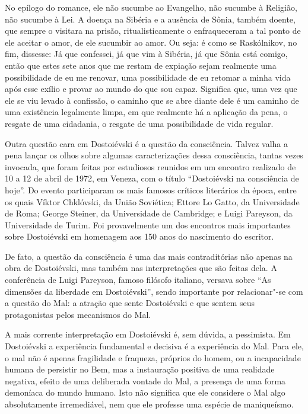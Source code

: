 No epílogo do romance, ele não sucumbe ao Evangelho, não sucumbe à
Religião, não sucumbe à Lei. A doença na Sibéria e a ausência de Sônia,
também doente, que sempre o visitara na prisão, ritualisticamente o
enfraqueceram a tal ponto de ele aceitar o amor, de ele sucumbir ao
amor. Ou seja: é como se Raskólnikov, no fim, dissesse: Já que
confessei, já que vim à Sibéria, já que Sônia está comigo, então que
estes sete anos que me restam de expiação sejam realmente uma
possibilidade de eu me renovar, uma possibilidade de eu retomar a minha
vida após esse exílio e provar ao mundo do que sou capaz. Significa que,
uma vez que ele se viu levado à confissão, o caminho que se abre diante
dele é um caminho de uma existência legalmente limpa, em que realmente
há a aplicação da pena, o resgate de uma cidadania, o resgate de uma
possibilidade de vida regular.

Outra questão cara em Dostoiévski é a questão da consciência. Talvez
valha a pena lançar os olhos sobre algumas caracterizações dessa
consciência, tantas vezes invocada, que foram feitas por estudiosos
reunidos em um encontro realizado de 10 a 12 de abril de 1972, em
Veneza, com o título ``Dostoiévski na consciência de hoje''. Do evento
participaram os mais famosos críticos literários da época, entre os
quais Víktor Chklóvski, da União Soviética; Ettore Lo Gatto, da
Universidade de Roma; George Steiner, da Universidade de Cambridge; e
Luigi Pareyson, da Universidade de Turim. Foi provavelmente um dos
encontros mais importantes sobre Dostoiévski em homenagem aos 150 anos
do nascimento do escritor.

De fato, a questão da consciência é uma das mais contraditórias não
apenas na obra de Dostoiévski, mas também nas interpretações que são
feitas dela. A conferência de Luigi Pareyson, famoso filósofo italiano,
versava sobre ``As dimensões da liberdade em Dostoiévski'', sendo
importante por relacionar"-se com a questão do Mal: a atração que sente
Dostoiévski e que sentem seus protagonistas pelos mecanismos do Mal.

A mais corrente interpretação em Dostoiévski é, sem dúvida, a
pessimista. Em Dostoiévski a experiência fundamental e decisiva é a
experiência do Mal. Para ele, o mal não é apenas fragilidade e fraqueza,
próprios do homem, ou a incapacidade humana de persistir no Bem, mas a
instauração positiva de uma realidade negativa, efeito de uma deliberada
vontade do Mal, a presença de uma forma demoníaca do mundo humano. Isto
não significa que ele considere o Mal algo absolutamente irremediável,
nem que ele professe uma espécie de maniqueísmo.

